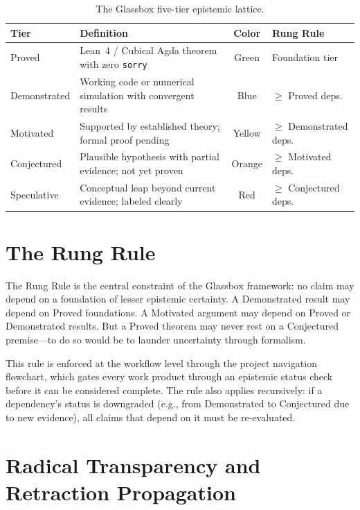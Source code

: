 \documentclass[12pt,letterpaper]{report}
\begin{document}
\begin{table}[ht]
\centering
\caption{The Glassbox five-tier epistemic lattice.}
\label{tab:epistemic}
\small
\begin{tabularx}{\textwidth}{l X c l}
\toprule
\textbf{Tier} & \textbf{Definition} & \textbf{Color} & \textbf{Rung Rule} \\
\midrule
\rowcolor{proved}
Proved & Lean~4 / Cubical Agda theorem with zero \texttt{sorry} & Green & Foundation tier \\
\rowcolor{demonstrated}
Demonstrated & Working code or numerical simulation with convergent results & Blue & $\geq$ Proved deps. \\
\rowcolor{motivated}
Motivated & Supported by established theory; formal proof pending & Yellow & $\geq$ Demonstrated deps. \\
\rowcolor{conjectured}
Conjectured & Plausible hypothesis with partial evidence; not yet proven & Orange & $\geq$ Motivated deps. \\
\rowcolor{speculative}
Speculative & Conceptual leap beyond current evidence; labeled clearly & Red & $\geq$ Conjectured deps. \\
\bottomrule
\end{tabularx}
\end{table}

\section{The Rung Rule}

The Rung Rule is the central constraint of the Glassbox framework: no claim may depend on a foundation of lesser epistemic certainty. A Demonstrated result may depend on Proved foundations. A Motivated argument may depend on Proved or Demonstrated results. But a Proved theorem may never rest on a Conjectured premise---to do so would be to launder uncertainty through formalism.

This rule is enforced at the workflow level through the project navigation flowchart, which gates every work product through an epistemic status check before it can be considered complete. The rule also applies recursively: if a dependency's status is downgraded (e.g., from Demonstrated to Conjectured due to new evidence), all claims that depend on it must be re-evaluated.

\section{Radical Transparency and Retraction Propagation}
\end{document}
